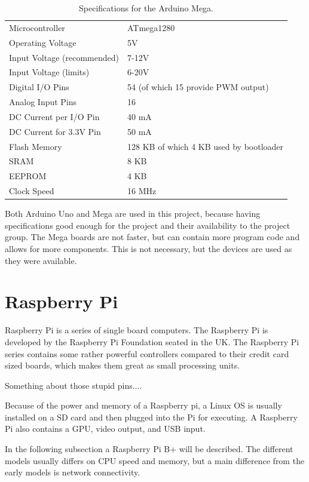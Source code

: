 \begin{table}[h!]
\begin{tabular}{| l | l |}
\hline
Microcontroller & ATmega1280\\
Operating Voltage & 5V\\
Input Voltage (recommended) & 7-12V\\
Input Voltage (limits) & 6-20V\\
Digital I/O Pins & 54 (of which 15 provide PWM output)\\
Analog Input Pins & 16\\
DC Current per I/O Pin & 40 mA\\
DC Current for 3.3V Pin & 50 mA\\
Flash Memory & 128 KB of which 4 KB used by bootloader\\
SRAM & 8 KB\\
EEPROM & 4 KB\\
Clock Speed & 16 MHz\\
\hline
\end{tabular}
\caption{Specifications for the Arduino Mega\cite{arduinomega}.}
\end{table}
\label{tab:megaspec}


Both Arduino Uno and Mega are used in this project, because having specifications good enough for the project and their availability to the project group. The Mega boards are not faster, but can contain more program code and allows for more components. This is not necessary, but the devices are used as they were available.

\section{Raspberry Pi}
Raspberry Pi is a series of single board computers. The Raspberry Pi is developed by the Raspberry Pi Foundation seated in the UK. The Raspberry Pi series contains some rather powerful controllers compared to their credit card sized boards, which makes them great as small processing units.

Something about those stupid pins....

Because of the power and memory of a Raspberry pi, a Linux OS is usually installed on a SD card and then plugged into the Pi for executing. A Raspberry Pi also contains a GPU, video output, and USB input.

In the following subsection a Raspberry Pi B+ will be described. The different models usually differs on CPU speed and memory, but a main difference from the early models is network connectivity.

